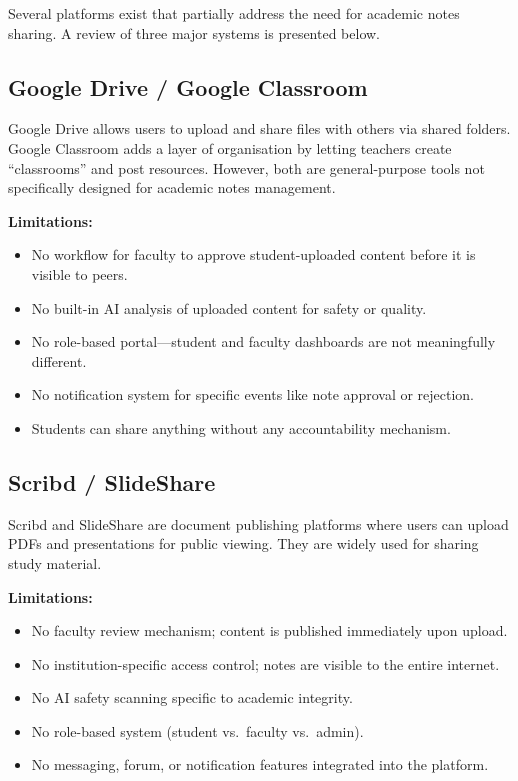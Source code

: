\documentclass{sgcproject}
\begin{document}
Several platforms exist that partially address the need for academic notes sharing. A review of three major systems is presented below.

\subsection{Google Drive / Google Classroom}

Google Drive allows users to upload and share files with others via shared folders. Google Classroom adds a layer of organisation by letting teachers create ``classrooms'' and post resources. However, both are general-purpose tools not specifically designed for academic notes management.

\textbf{Limitations:}
\begin{itemize}
    \item No workflow for faculty to approve student-uploaded content before it is visible to peers.
    \item No built-in AI analysis of uploaded content for safety or quality.
    \item No role-based portal---student and faculty dashboards are not meaningfully different.
    \item No notification system for specific events like note approval or rejection.
    \item Students can share anything without any accountability mechanism.
\end{itemize}

\subsection{Scribd / SlideShare}

Scribd and SlideShare are document publishing platforms where users can upload PDFs and presentations for public viewing. They are widely used for sharing study material.

\textbf{Limitations:}
\begin{itemize}
    \item No faculty review mechanism; content is published immediately upon upload.
    \item No institution-specific access control; notes are visible to the entire internet.
    \item No AI safety scanning specific to academic integrity.
    \item No role-based system (student vs.\ faculty vs.\ admin).
    \item No messaging, forum, or notification features integrated into the platform.
\end{itemize}
\end{document}
